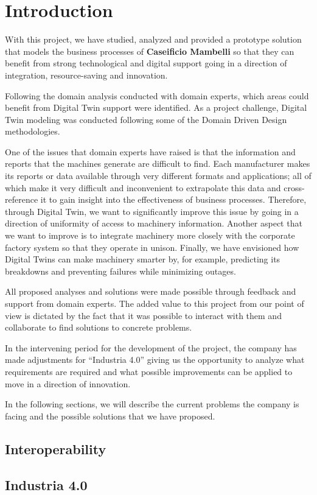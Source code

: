 \chapter{Introduction}
With this project, we have studied, analyzed and provided a prototype solution that models the business processes of \textbf{Caseificio Mambelli} so
that they can benefit from strong technological and digital support going in a direction of integration, resource-saving and innovation.

Following the domain analysis conducted with domain experts, which areas could benefit from Digital Twin support were identified.
As a project challenge, Digital Twin modeling was conducted following some of the Domain Driven Design methodologies.

One of the issues that domain experts have raised is that the information and reports that the machines generate are difficult to find.
Each manufacturer makes its reports or data available through very different formats and applications; all of which make it very difficult
and inconvenient to extrapolate this data and cross-reference it to gain insight into the effectiveness of business processes.
Therefore, through Digital Twin, we want to significantly improve this issue by going in a direction of uniformity of access to machinery
information.
Another aspect that we want to improve is to integrate machinery more closely with the corporate factory system so that they operate in unison.
Finally, we have envisioned how Digital Twins can make machinery smarter by, for example, predicting its breakdowns and preventing failures while
minimizing outages.

All proposed analyses and solutions were made possible through feedback and support from domain experts.
The added value to this project from our point of view is dictated by the fact that it was possible to interact with them and collaborate to find
solutions to concrete problems.

In the intervening period for the development of the project, the company has made adjustments for ``Industria 4.0'' giving us the opportunity to
analyze what requirements are required and what possible improvements can be applied to move in a direction of innovation.

In the following sections, we will describe the current problems the company is facing and the possible solutions that we have proposed.

\section{Interoperability}

\section{Industria 4.0}
